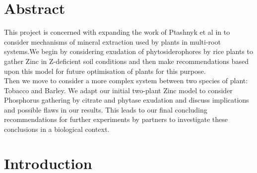 \documentclass[11pt]{article}
\numberwithin{equation}{section}
\begin{document}
\newpage
\section*{Abstract}
This project is concerned with expanding the work of Ptashnyk et al in \cite{Ptashnyk-2011} to consider mechanisms of mineral extraction used by plants in multi-root systems.We begin by considering exudation of phytosiderophores by rice plants to gather Zinc in Z-deficient soil conditions and then make recommendations based upon this model for future optimisation of plants for this purpose.\\
Then we move to consider a more complex system between two species of plant: Tobacco and Barley. We adapt our initial two-plant Zinc model to consider Phosphorus gathering by citrate and phytase exudation and  discuss implications and possible flaws in our results. This leads to our final concluding recommendations for further experiments by partners to investigate these conclusions in a biological context.
\newpage
\doublespacing
\tableofcontents

\singlespacing
\newpage
{}
\setcounter{page}{1}




\section{Introduction}
\end{document}
